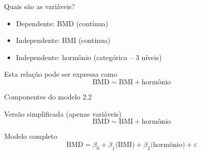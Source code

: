 \documentclass{beamer}
\begin{document}
\begin{frame}{\scriptsize Quais são as variáveis?}
  \begin{itemize}
    \footnotesize
  \item Dependente: BMD (contínua)
  \item Independente: BMI (contínua)
  \item Independente: hormônio (categórica -- 3 níveis)
  \end{itemize}
  \vfill
  \begin{block}{Esta relação pode ser expressa como}
    \footnotesize
    \begin{displaymath}
      \text{BMD} \sim \text{BMI} + \text{hormônio}
    \end{displaymath}
  \end{block}
\end{frame}

\begin{frame}{\scriptsize Componentes do modelo 2.2}
  \begin{block}{\footnotesize Versão simplificada (apenas variáveis)}
    \footnotesize
    \begin{displaymath}
      \text{BMD} \sim \text{BMI} + \text{hormônio}
    \end{displaymath}
  \end{block}
  \bigskip
  \bigskip
  \begin{block}{Modelo completo}
    \footnotesize
    \begin{displaymath}
      \text{BMD} =\beta_0 + \beta_1 \text{(BMI)} + \beta_2 \text{(hormônio)} +\varepsilon
    \end{displaymath}
  \end{block}
  \vfill
\end{frame}
\end{document}
